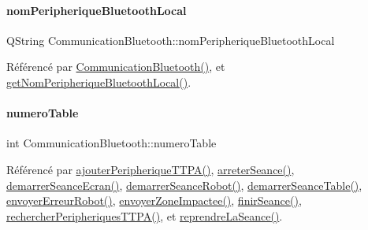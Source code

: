 \mbox{\label{class_communication_bluetooth_a6781eed73c4b5db0fe7ff94c034f2cf5}} 
\paragraph{\texorpdfstring{nom\+Peripherique\+Bluetooth\+Local}{nomPeripheriqueBluetoothLocal}}
{\footnotesize\ttfamily Q\+String Communication\+Bluetooth\+::nom\+Peripherique\+Bluetooth\+Local}



Référencé par \hyperlink{class_communication_bluetooth_ae1c3be7b0a32ee1142d958bad3d7c571}{Communication\+Bluetooth()}, et \hyperlink{class_communication_bluetooth_a20694d5121f78fe4b83b1ef93a2dd5d1}{get\+Nom\+Peripherique\+Bluetooth\+Local()}.

\mbox{\label{class_communication_bluetooth_a9428f8261f0cc055e9c6fed9a61cb595}} 
\paragraph{\texorpdfstring{numero\+Table}{numeroTable}}
{\footnotesize\ttfamily int Communication\+Bluetooth\+::numero\+Table}



Référencé par \hyperlink{class_communication_bluetooth_a53bc4772892ec57f030600e49fa0b6ff}{ajouter\+Peripherique\+T\+T\+P\+A()}, \hyperlink{class_communication_bluetooth_a4b0e71c1f161c14278f3ab55b1910c64}{arreter\+Seance()}, \hyperlink{class_communication_bluetooth_a024493f537e8501a813e1555716cf7ad}{demarrer\+Seance\+Ecran()}, \hyperlink{class_communication_bluetooth_a02e74da6910804557f31e81f26201f89}{demarrer\+Seance\+Robot()}, \hyperlink{class_communication_bluetooth_abb71c8f555c64d1791d330955ace417c}{demarrer\+Seance\+Table()}, \hyperlink{class_communication_bluetooth_a891295407273a810ef9300e743bc34f9}{envoyer\+Erreur\+Robot()}, \hyperlink{class_communication_bluetooth_a5906cd18db7ce9467452acf0ed845f23}{envoyer\+Zone\+Impactee()}, \hyperlink{class_communication_bluetooth_ab2170ef9c868ac2a26b76675c71f770e}{finir\+Seance()}, \hyperlink{class_communication_bluetooth_a4c2e2d557728c227faeb247cb8a9c482}{rechercher\+Peripheriques\+T\+T\+P\+A()}, et \hyperlink{class_communication_bluetooth_a1bcf85f34d2902ba6fe3b6929b409272}{reprendre\+La\+Seance()}.

